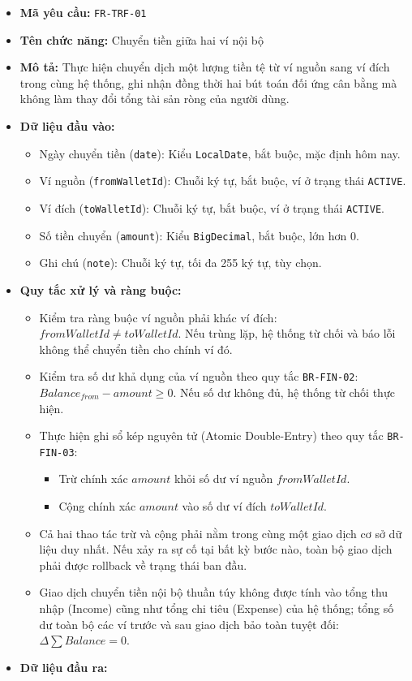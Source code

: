 \documentclass[11pt,a4paper]{article}
\providecommand{\tightlist}{
  \setlength{\itemsep}{0pt}\setlength{\parskip}{0pt}}
\begin{document}
\begin{itemize}
\tightlist
\item
  \textbf{Mã yêu cầu:} \texttt{FR-TRF-01}
\item
  \textbf{Tên chức năng:} Chuyển tiền giữa hai ví nội bộ
\item
  \textbf{Mô tả:} Thực hiện chuyển dịch một lượng tiền tệ từ ví nguồn
  sang ví đích trong cùng hệ thống, ghi nhận đồng thời hai bút toán đối
  ứng cân bằng mà không làm thay đổi tổng tài sản ròng của người dùng.
\item
  \textbf{Dữ liệu đầu vào:}

  \begin{itemize}
  \tightlist
  \item
    Ngày chuyển tiền (\texttt{date}): Kiểu \texttt{LocalDate}, bắt buộc,
    mặc định hôm nay.
  \item
    Ví nguồn (\texttt{fromWalletId}): Chuỗi ký tự, bắt buộc, ví ở trạng
    thái \texttt{ACTIVE}.
  \item
    Ví đích (\texttt{toWalletId}): Chuỗi ký tự, bắt buộc, ví ở trạng
    thái \texttt{ACTIVE}.
  \item
    Số tiền chuyển (\texttt{amount}): Kiểu \texttt{BigDecimal}, bắt
    buộc, lớn hơn 0.
  \item
    Ghi chú (\texttt{note}): Chuỗi ký tự, tối đa 255 ký tự, tùy chọn.
  \end{itemize}
\item
  \textbf{Quy tắc xử lý và ràng buộc:}

  \begin{itemize}
  \tightlist
  \item
    Kiểm tra ràng buộc ví nguồn phải khác ví đích:
    \(fromWalletId \ne toWalletId\). Nếu trùng lặp, hệ thống từ chối và
    báo lỗi không thể chuyển tiền cho chính ví đó.
  \item
    Kiểm tra số dư khả dụng của ví nguồn theo quy tắc
    \texttt{BR-FIN-02}: \(Balance_{from} - amount \ge 0\). Nếu số dư
    không đủ, hệ thống từ chối thực hiện.
  \item
    Thực hiện ghi sổ kép nguyên tử (Atomic Double-Entry) theo quy tắc
    \texttt{BR-FIN-03}:

    \begin{itemize}
    \tightlist
    \item
      Trừ chính xác \(amount\) khỏi số dư ví nguồn \(fromWalletId\).
    \item
      Cộng chính xác \(amount\) vào số dư ví đích \(toWalletId\).
    \end{itemize}
  \item
    Cả hai thao tác trừ và cộng phải nằm trong cùng một giao dịch cơ sở
    dữ liệu duy nhất. Nếu xảy ra sự cố tại bất kỳ bước nào, toàn bộ giao
    dịch phải được rollback về trạng thái ban đầu.
  \item
    Giao dịch chuyển tiền nội bộ thuần túy không được tính vào tổng thu
    nhập (Income) cũng như tổng chi tiêu (Expense) của hệ thống; tổng số
    dư toàn bộ các ví trước và sau giao dịch bảo toàn tuyệt đối:
    \(\Delta \sum Balance = 0\).
  \end{itemize}
\item
  \textbf{Dữ liệu đầu ra:}


\end{itemize}
\end{document}
